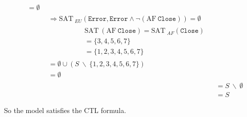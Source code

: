 \documentclass{ctexart}
\def\n{\neg}
\def\c{\wedge}
\def\SAT{\mathrm{SAT\ }}
\def\AF{\mathrm{AF\ }}
\def\cl{\texttt{Close}}
\def\er{\texttt{Error}}
\def\bs{\ \backslash\ }
\newcommand{\set}[1]{\{#1\}}
\begin{document}
\begin{equation*}
\begin{split}
\begin{split}
\begin{split}
                 & = \emptyset
             \end{split}
             \\ & \Rightarrow \SAT_{EU}(\er, \er \c \n (\AF \cl)) = \emptyset \\
             & \qquad \qquad
             \begin{split}
                 & \SAT(\AF \cl) = \SAT_{AF} (\cl)\\
                 & = \set{3,4,5,6,7} \\
                 & = \set{1,2,3,4,5,6,7}
             \end{split}
             \\ & = \emptyset \cup (S \bs \set{1,2,3,4,5,6,7}) \\
             & = \emptyset
        \end{split}
        \\ & = S \bs \emptyset \\
        & = S
    \end{split}
\end{equation*}

So the model satisfies the CTL formula.
\end{document}
